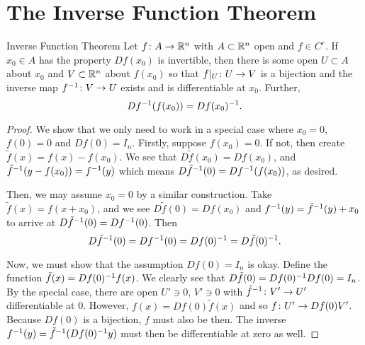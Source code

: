 \documentclass{article}
\begin{document}
\section{The Inverse Function Theorem}

\begin{theorem}{Inverse Function Theorem}{}
  Let $f \from A \to \RR[n]$ with $A \subset \RR[n]$ open and $f \in C^{r}$.
  If $x_{0} \in A$ has the property $Df(x_{0})$ is invertible, then there is some open $U \subset A$ about $x_{0}$ and $V \subset \RR[n]$ about $f(x_{0})$ so that
  $f|_{U} \from U \to V$ is a bijection and the inverse map $f \inv \from V \to U$ exists and is differentiable at $x_{0}$. Further,
  \[ Df\inv(f(x_{0})) = Df(x_{0})\inv. \]
\end{theorem}
\begin{proof}
  We show that we only need to work in a special case where $x_{0} = 0$, $f(0) = 0$ and $Df(0) = I_{n}$.
  Firstly, suppose $f(x_{0}) = 0$. If not, then create $\tilde{f}(x) = f(x) - f(x_{0})$.
  We see that $D\tilde{f}(x_{0}) = Df(x_{0})$, and $\tilde{f}\inv(y - f(x_{0})) = f\inv(y)$ which means $D\tilde{f}\inv(0) = Df\inv(f(x_{0}))$, as desired.

  Then, we may assume $x_{0} = 0$ by a similar construction. Take $\tilde{f}(x) = f(x + x_{0})$, and we see $D\tilde{f}(0) = Df(x_{0})$ and $f\inv(y) = \tilde{f}\inv(y) + x_{0}$
  to arrive at $D\tilde{f}\inv(0) = Df\inv(0)$. Then
  \[ D\tilde{f}\inv(0) = Df\inv(0) = Df(0)\inv = D\tilde{f}(0)\inv. \]

  \newpage
  Now, we must show that the assumption $Df(0) = I_{n}$ is okay. Define the function $\tilde{f}(x) = Df(0)\inv f(x)$.
  We clearly see that $D\tilde{f}(0) = Df(0)\inv Df(0) = I_{n}$. By the special case, there are open $U' \ni 0$, $V' \ni 0$ with $\tilde{f}\inv \from V' \to U'$ differentiable at 0.
  However, $f(x) = Df(0) \tilde{f}(x)$ and so $f \from U' \to Df(0) V'$.
  Because $Df(0)$ is a bijection, $f$ must also be then.
  The inverse $f\inv(y) = \tilde{f}\inv(Df(0)\inv y)$ must then be differentiable at zero as well.


\end{proof}
\end{document}
